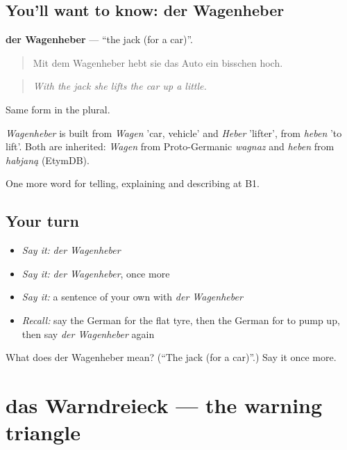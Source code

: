 \subsection*{You'll want to know: der Wagenheber}
\textbf{der Wagenheber} — \textquotedblleft{}the jack (for a car)\textquotedblright{}.

\begin{quote}
Mit dem Wagenheber hebt sie das Auto ein bisschen hoch.
\end{quote}

\begin{quote}
\emph{With the jack she lifts the car up a little.}
\end{quote}

Same form in the plural.

\begin{cousinweb}
\emph{Wagenheber} is built from \emph{Wagen} 'car, vehicle' and \emph{Heber} 'lifter', from \emph{heben} 'to lift'. Both are inherited: \emph{Wagen} from Proto-Germanic \emph{wagnaz} and \emph{heben} from \emph{habjaną} (EtymDB).
\end{cousinweb}

\begin{grammarlens}[title={What you've built}]
One more word for telling, explaining and describing at B1.
\end{grammarlens}

\subsection*{Your turn}
\begin{itemize}
\raggedright
  \item \emph{Say it:} \emph{der Wagenheber}
  \item \emph{Say it:} \emph{der Wagenheber}, once more
  \item \emph{Say it:} a sentence of your own with \emph{der Wagenheber}
  \item \emph{Recall:} say the German for the flat tyre, then the German for to pump up, then say \emph{der Wagenheber} again
\end{itemize}

\begin{tcolorbox}[breakable,colback=teal!4,colframe=teal!35!black,title={Before you move on}]
What does der Wagenheber mean? (\textquotedblleft{}The jack (for a car)\textquotedblright{}.) Say it once more.
\end{tcolorbox}
\section[das Warndreieck]{das Warndreieck — the warning triangle}


